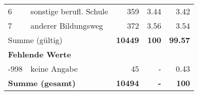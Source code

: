 \begin{longtable}{lXrrr}
     6 &
     \multicolumn{1}{X}{ sonstige berufl. Schule   } &


       \num{359} &
       \num[round-mode=places,round-precision=2]{3.44} &
         \num[round-mode=places,round-precision=2]{3.42} \\

     7 &
     \multicolumn{1}{X}{ anderer Bildungsweg   } &


       \num{372} &
       \num[round-mode=places,round-precision=2]{3.56} &
         \num[round-mode=places,round-precision=2]{3.54} \\
     \midrule
     \multicolumn{2}{l}{Summe (gültig)} &
       \textbf{\num{10449}} &
     \textbf{\num{100}} &
       \textbf{\num[round-mode=places,round-precision=2]{99.57}} \\
     \multicolumn{5}{l}{\textbf{Fehlende Werte}}\\
       -998 &
       keine Angabe &
         \num{45} &
        - &
         \num[round-mode=places,round-precision=2]{0.43} \\
     \midrule
     \multicolumn{2}{l}{\textbf{Summe (gesamt)}} &
          \textbf{\num{10494}} &
        \textbf{-} &
        \textbf{\num{100}} \\
     \bottomrule
     \end{longtable}
     

